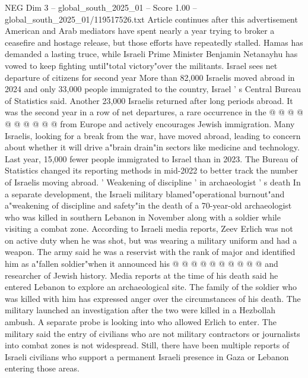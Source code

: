 \begin{textsample}{NEG Dim 3 – global\_south\_2025\_01 – Score 1.00 – global\_south\_2025\_01/119517526.txt}
Article continues after this advertisement American and Arab mediators have spent nearly a year trying to broker a ceasefire and hostage release, but those efforts have repeatedly stalled.
Hamas has demanded a lasting truce, while Israeli Prime Minister Benjamin Netanayhu has vowed to keep fighting until"total victory"over the militants.
Israel sees net departure of citizens for second year More than 82,000 Israelis moved abroad in 2024 and only 33,000 people immigrated to the country, Israel ' s Central Bureau of Statistics said.
Another 23,000 Israelis returned after long periods abroad.
It was the second year in a row of net departures, a rare occurrence in the @ @ @ @ @ @ @ @ @ @ from Europe and actively encourages Jewish immigration.
Many Israelis, looking for a break from the war, have moved abroad, leading to concern about whether it will drive a"brain drain"in sectors like medicine and technology.
Last year, 15,000 fewer people immigrated to Israel than in 2023.
The Bureau of Statistics changed its reporting methods in mid-2022 to better track the number of Israelis moving abroad. ' Weakening of discipline ' in archaeologist ' s death In a separate development, the Israeli military blamed"operational burnout"and a"weakening of discipline and safety"in the death of a 70-year-old archaeologist who was killed in southern Lebanon in November along with a soldier while visiting a combat zone.
According to Israeli media reports, Zeev Erlich was not on active duty when he was shot, but was wearing a military uniform and had a weapon.
The army said he was a reservist with the rank of major and identified him as a"fallen soldier"when it announced his @ @ @ @ @ @ @ @ @ @ and researcher of Jewish history.
Media reports at the time of his death said he entered Lebanon to explore an archaeological site.
The family of the soldier who was killed with him has expressed anger over the circumstances of his death.
The military launched an investigation after the two were killed in a Hezbollah ambush.
A separate probe is looking into who allowed Erlich to enter.
The military said the entry of civilians who are not military contractors or journalists into combat zones is not widespread.
Still, there have been multiple reports of Israeli civilians who support a permanent Israeli presence in Gaza or Lebanon entering those areas.

\end{textsample}
